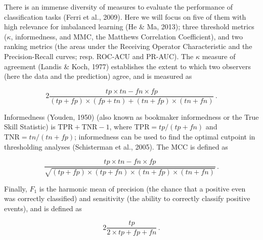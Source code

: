 \documentclass[10pt,oneside]{article}
\begin{document}
There is an immense diversity of measures to evaluate the performance of
classification tasks (Ferri et al., 2009). Here we will focus on five of
them with high relevance for imbalanced learning (He \& Ma, 2013); three
threshold metrics (\(\kappa\), informedness, and MMC, the Matthews
Correlation Coefficient), and two ranking metrics (the areas under the
Receiving Operator Characteristic and the Precision-Recall curves; resp.
ROC-ACU and PR-AUC). The \(\kappa\) measure of agreement (Landis \&
Koch, 1977) establishes the extent to which two observers (here the data
and the prediction) agree, and is measured as

\[
2\frac{tp\times tn - fn\times fp}{(tp+fp)\times (fp+tn)+(tn+fp)\times (tn+fn)} \,.
\]

Informedness (Youden, 1950) (also known as bookmaker informedness or the
True Skill Statistic) is \(\text{TPR}+\text{TNR}-1\), where
\(\text{TPR}= tp/(tp+fn)\) and \(\text{TNR} = tn/(tn+fp)\); informedness
can be used to find the optimal cutpoint in thresholding analyses
(Schisterman et al., 2005). The MCC is defined as

\[
\frac{tp\times tn - fn\times fp}{\sqrt{(tp+fp)\times (tp+fn)\times (tn+fp)\times (tn+fn)}} \,.
\]

Finally, \(F_1\) is the harmonic mean of precision (the chance that a
positive even was correctly classified) and sensitivity (the ability to
correctly classify positive events), and is defined as

\[
2\frac{tp}{2\times tp + fp + fn}\,.
\]
\end{document}
